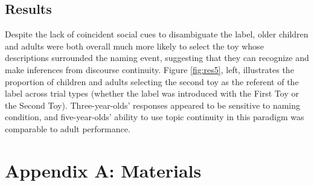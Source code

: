 \documentclass[man]{apa2}
\begin{document}
\subsection{Results}

Despite the lack of coincident social cues to disambiguate the label, older children and adults were both overall much more likely to select the toy whose descriptions surrounded the naming event, suggesting that they can recognize and make inferences from discourse continuity.  Figure \ref{fig:res5}, left, illustrates the proportion of children and adults selecting the second toy as the referent of the label across trial types (whether the label was introduced with the First Toy or the Second Toy). Three-year-olds' responses appeared to be sensitive to naming condition, and five-year-olds' ability to use topic continuity in this paradigm was comparable to adult performance.





\newpage
\theappendix 

\section{Appendix A: Materials}
\end{document}
